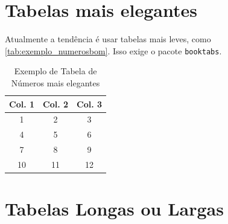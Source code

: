 \documentclass[dsc,pdfa,setavermelha]{ufrj}
\theoremstyle{plain}
\theoremstyle{definition}
\theoremstyle{remark}
\begin{document}
\begin{mapa}[ht]
\centering
\caption{Primeiro mapa, num float criado pelo autor}
\label{mapa:primeiro}
\end{mapa}

\begin{mapa}[ht]
\centering
\caption{Segundo mapa, para provar o contador e a lista}
\label{mapa:segundo}
\end{mapa}

\section{Tabelas mais elegantes}

Atualmente a tendência é usar tabelas mais leves, como \autoref{tab:exemplo_numerosbom}. Isso exige o pacote \verb*|booktabs|.

\begin{table}[ht]
\centering %
\caption{Exemplo de Tabela de Números mais elegantes}
\label{tab:exemplo_numerosbom}
\begin{tabular}{ccc} %
\toprule %
\textbf{Col. 1} & \textbf{Col. 2} & \textbf{Col. 3} \\ %
\midrule %
1 & 2 & 3 \\ %
4 & 5 & 6 \\ %
7 & 8 & 9 \\ %
10 & 11 & 12 \\ %
\bottomrule %
\end{tabular}
\end{table}

\section{Tabelas Longas ou Largas}
\end{document}
